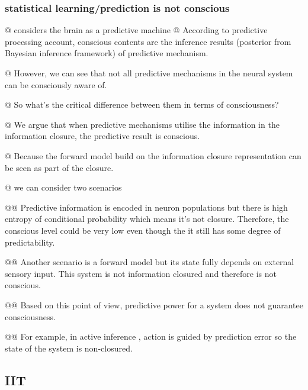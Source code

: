 \documentclass[utf8]{article}
\newenvironment{ants}
			{
			 \begin{easylist}[itemize]
			}
			{
			\end{easylist}
			}
\newcommand{\needref}[1]{%
			\ifthenelse{\equal{#1}{}}{%
				\todo[color=White, linecolor=BlueViolet]{\textcolor{BlueViolet}{Ref}}}{%
				\todo[color=White, linecolor=BlueViolet]{\textcolor{BlueViolet}{Ref: #1}}%
				}%
		}
\newcommand{\callforhelp}[1]{\todo[color=SpringGreen]{#1}}
\begin{document}
			\subsubsection{statistical learning/prediction is not conscious}
				\begin{ants}
					@ considers the brain as a predictive machine
					@ According to predictive processing account, conscious contents are the inference results (posterior from Bayesian inference framework) of predictive mechanism. 
					
					@ However, we can see that not all predictive mechanisms in the neural system can be consciously aware of. 
					
					@ So what's the critical difference between them in terms of consciousness?
					
					@ We argue that when predictive mechanisms utilise the information in the information closure, the predictive result is conscious. 
					
					@ Because the forward model build on the information closure representation can be seen as part of the closure. 
					
					
					@ we can consider two scenarios
						
						@@ Predictive information is encoded in neuron populations but there is high entropy of conditional probability which means it's not closure. Therefore, the conscious level could be very low even though the it still has some degree of predictability. 
						
						@@ Another scenario is a forward model but its state fully depends on external sensory input. This system is not information closured and therefore is not conscious. 
						
						@@ Based on this point of view, predictive power for a system does not guarantee consciousness. 
						
						@@ For example, in active inference \needref{active inference}, action is guided by prediction error so the state of the system is non-closured. 
					
				\end{ants}
				
			
		\subsection{IIT}
			\callforhelp{Help from Jun?}
			
			
\end{document}
